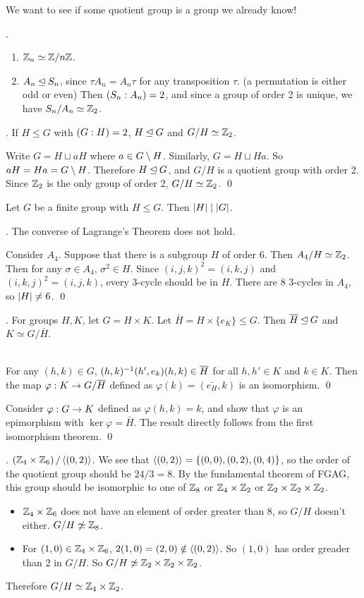 We want to see if some quotient group is a group we already know!

\ex.
\begin{enumerate}
    \item \(\mathbb{Z}_n \simeq \mathbb{Z} / n\mathbb{Z}\).
    \item \(A_n \unlhd S_n\), since \(\tau A_n = A_n \tau\) for any transposition \(\tau\). (a permutation is either odd or even) Then \(\left(S_n : A_n\right) = 2\), and since a group of order 2 is unique, we have \(S_n / A_n \simeq \mathbb{Z}_2\).
\end{enumerate}

\thm. If \(H \leq G\) with \(\left(G : H\right) = 2\), \(H \unlhd G\) and \(G/H \simeq \mathbb{Z}_2\).

\pf Write \(G = H \sqcup aH\) where \(a \in G \setminus H\). Similarly, \(G = H \sqcup Ha\). So \(aH = Ha = G \setminus H\). Therefore \(H \unlhd G\), and \(G/H\) is a quotient group with order 2. Since \(\mathbb{Z}_2\) is the only group of order 2, \(G/H \simeq \mathbb{Z}_2\). \qed

\recall {} Let \(G\) be a finite group with \(H \leq G\). Then \(\left| H \right| \mid \left| G \right|\).

\prop. The converse of Lagrange's Theorem does not hold.

\pf Consider \(A_4\). Suppose that there is a subgroup \(H\) of order 6. Then \(A_4 / H \simeq \mathbb{Z}_2\). Then for any \(\sigma \in A_4\), \(\sigma^2 \in H\). Since \((i, j, k)^2 = (i, k, j)\) and \((i, k, j)^2 = (i, j, k)\), every 3-cycle should be in \(H\). There are 8 3-cycles in \(A_4\), so \(\left| H \right| \neq 6\). \qed

\thm. For groups \(H, K\), let \(G = H \times K\). Let \(\bar{H} = H \times \{e_K\} \leq G\). Then \(\bar{H} \nsub G\) and \(K \simeq G/\bar{H}\).

\pf \\
 For any \((h, k) \in G\), \((h, k)\inv(h', e_k)(h, k) \in \bar{H}\) for all \(h, h' \in K\) and \(k \in K\). Then the map \(\varphi: K \ra G/\bar{H}\) defined as \(\varphi(k) = (\bar{e_H}, k)\) is an isomorphism. \qed

 Consider \(\varphi : G \rightarrow K\) defined as \(\varphi(h, k) = k\), and show that \(\varphi\) is an epimorphism with \(\ker \varphi = \bar{H}\). The result directly follows from the first isomorphism theorem. \qed

\ex. \((\mathbb{Z}_4 \times \mathbb{Z}_6) \operatorname{/} \left\langle (0, 2) \right\rangle\). We see that \(\left\langle (0, 2) \right\rangle = \{(0, 0), (0, 2), (0, 4)\}\), so the order of the quotient group should be \(24/3 = 8\). By the fundamental theorem of FGAG, this group should be isomorphic to one of \(\mathbb{Z}_8\) or \(\mathbb{Z}_4 \times \mathbb{Z}_2\) or \(\mathbb{Z}_2 \times \mathbb{Z}_2 \times \mathbb{Z}_2\).
\begin{itemize}
    \item \(\mathbb{Z}_4 \times \mathbb{Z}_6\) does not have an element of order greater than 8, so \(G/H\) doesn't either. \(G/H \not\simeq \mathbb{Z}_8\).
    \item For \((1, 0) \in \mathbb{Z}_4 \times \mathbb{Z}_6\), \(2(1, 0) = (2, 0) \notin \left\langle (0, 2) \right\rangle\). So \((1, 0)\) has order greader than 2 in \(G/H\). So \(G/H \not\simeq \mathbb{Z}_2 \times \mathbb{Z}_2 \times \mathbb{Z}_2\).
\end{itemize}
Therefore \(G/H \simeq \mathbb{Z}_4 \times \mathbb{Z}_2\).

